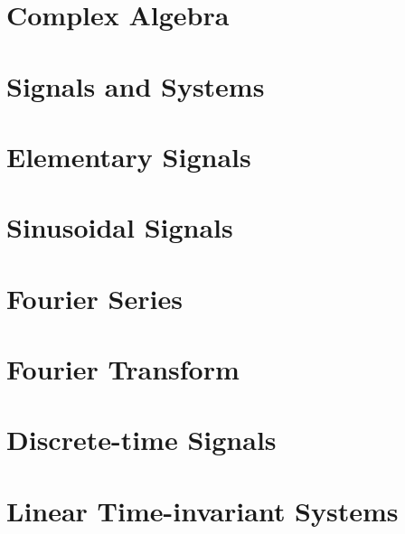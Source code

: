 \documentclass{tufte-book}
\begin{document}
\ifSpComplex
\chapter{Complex Algebra}



\fi

\ifSpSigSys
\chapter{Signals and Systems}



\fi

\ifSpElSig
\chapter{Elementary Signals}



\fi

\ifSpSin
\chapter{Sinusoidal Signals}



\fi

\ifSpdB

\fi

\ifSpFourierSer
\chapter{Fourier Series}






\fi

\ifSpProgA

\fi

\ifSpFourierTra
\chapter{Fourier Transform}





\fi

\ifSpDT
\chapter{Discrete-time Signals}



\fi

\ifSpLTI
\chapter{Linear Time-invariant Systems}





\fi
\end{document}
